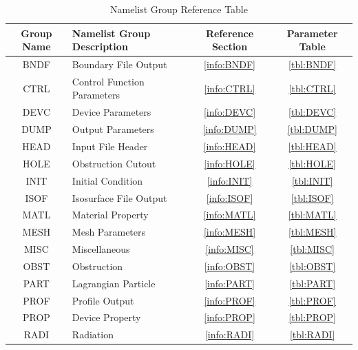 \documentclass[11pt]{book}
\begin{document}
\vspace{\baselineskip}
\begin{table}[ht]
\label{tbl:namelistgroups}
\begin{center}
\caption{Namelist Group Reference Table}
\begin{tabular}{|c|l|c|c|}
\hline
Group Name  & Namelist Group Description& Reference Section & Parameter Table  \\ \hline
{\ct BNDF}  & Boundary File Output         & \ref{info:BNDF} & \ref{tbl:BNDF}  \\ \hline
{\ct CTRL}  & Control Function Parameters  & \ref{info:CTRL} & \ref{tbl:CTRL}  \\ \hline
{\ct DEVC}  & Device Parameters            & \ref{info:DEVC} & \ref{tbl:DEVC}  \\ \hline
{\ct DUMP}  & Output Parameters            & \ref{info:DUMP} & \ref{tbl:DUMP}  \\ \hline
{\ct HEAD}  & Input File Header            & \ref{info:HEAD} & \ref{tbl:HEAD}  \\ \hline
{\ct HOLE}  & Obstruction Cutout           & \ref{info:HOLE} & \ref{tbl:HOLE}  \\ \hline
{\ct INIT}  & Initial Condition            & \ref{info:INIT} & \ref{tbl:INIT}  \\ \hline
{\ct ISOF}  & Isosurface File Output       & \ref{info:ISOF} & \ref{tbl:ISOF}  \\ \hline
{\ct MATL}  & Material Property            & \ref{info:MATL} & \ref{tbl:MATL}  \\ \hline
{\ct MESH}  & Mesh Parameters              & \ref{info:MESH} & \ref{tbl:MESH}  \\ \hline
{\ct MISC}  & Miscellaneous                & \ref{info:MISC} & \ref{tbl:MISC}  \\ \hline
{\ct OBST}  & Obstruction                  & \ref{info:OBST} & \ref{tbl:OBST}  \\ \hline
{\ct PART}  & Lagrangian Particle          & \ref{info:PART} & \ref{tbl:PART}  \\ \hline
{\ct PROF}  & Profile Output               & \ref{info:PROF} & \ref{tbl:PROF}  \\ \hline
{\ct PROP}  & Device Property              & \ref{info:PROP} & \ref{tbl:PROP}  \\ \hline
{\ct RADI}  & Radiation                    & \ref{info:RADI} & \ref{tbl:RADI}  \\ \hline

\end{tabular}
\end{center}
\end{table}
\end{document}
